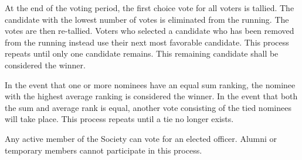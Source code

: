 \documentclass[american]{article}
\begin{document}
At the end of the voting period, the first choice vote for all voters is tallied. The candidate with the lowest number of votes is eliminated from the running. The votes are then re-tallied. Voters who selected a candidate who has been removed from the running instead use their next most favorable candidate. This process repeats until only one candidate remains. This remaining candidate shall be considered the winner.

In the event that one or more nominees have an equal sum ranking, the nominee with the highest average ranking is considered the winner. In the event that both the sum and average rank is equal, another vote consisting of the tied nominees will take place. This process repeats until a tie no longer exists.

Any active member of the Society can vote for an elected officer. Alumni or temporary members cannot participate in this process.
\end{document}
